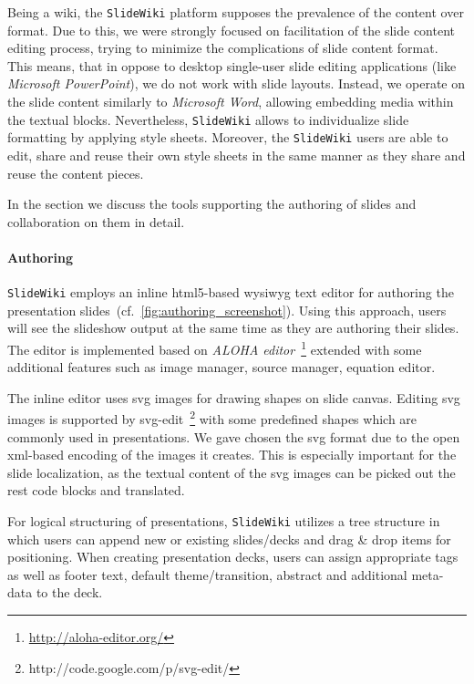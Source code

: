\documentclass[PhD, Submit, ngerman,UKenglish,table]{scrbook}
\begin{document}
Being a wiki, the \texttt{SlideWiki} platform supposes the prevalence of the content over format.
Due to this, we were strongly focused on facilitation of the slide content editing process, trying to minimize the complications of slide content format.
This means, that in oppose to desktop single-user slide editing applications (like \emph{Microsoft PowerPoint}), we do not work with slide layouts.
Instead, we operate on the slide content similarly to \emph{Microsoft Word}, allowing embedding media within the textual blocks.
Nevertheless, \texttt{SlideWiki} allows to individualize slide formatting by applying style sheets.
Moreover, the \texttt{SlideWiki} users are able to edit, share and reuse their own style sheets in the same manner as they share and reuse the content pieces.

In the section we discuss the tools supporting the authoring of slides and collaboration on them in detail.

\paragraph{Authoring}
\texttt{SlideWiki} employs an inline \gls{html}5-based \gls{wysiwyg} text editor for authoring the presentation slides~(cf.~\autoref{fig:authoring_screenshot}).
Using this approach, users will see the slideshow output at the same time as they are authoring their slides.
The editor is implemented based on \emph{ALOHA editor}~\footnote{\url{http://aloha-editor.org/}} extended with some additional features such as image manager, source manager, equation editor.

The inline editor uses \gls{svg} images for drawing shapes on slide canvas.
Editing \gls{svg} images is supported by \gls{svg}-edit~\footnote{http://code.google.com/p/svg-edit/} with some predefined shapes which are commonly used in presentations.
We gave chosen the \gls{svg} format due to the open \gls{xml}-based encoding of the images it creates.
This is especially important for the slide localization, as the textual content of the \gls{svg} images can be picked out the rest code blocks and translated.

For logical structuring of presentations, \texttt{SlideWiki} utilizes a tree structure in which users can append new or existing slides/decks and drag \& drop items for positioning.
When creating presentation decks, users can assign appropriate tags as well as footer text, default theme/transition, abstract and additional meta-data to the deck.
\end{document}
